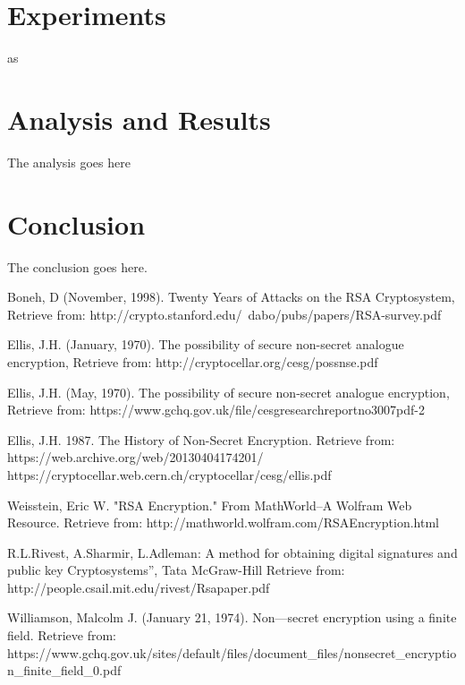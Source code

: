 \documentclass[conference,compsoc, 10pt]{IEEEtran}
\begin{document}
\section{Experiments}
as

\section{Analysis and Results}
The analysis goes here

\section{Conclusion}
The conclusion goes here.

\large
\begin{thebibliography}{1}
Boneh, D (November, 1998). Twenty Years of Attacks on the RSA Cryptosystem, Retrieve from: http://crypto.stanford.edu/~dabo/pubs/papers/RSA-survey.pdf

Ellis, J.H. (January, 1970). The possibility of secure non-secret analogue encryption, Retrieve from: http://cryptocellar.org/cesg/possnse.pdf

Ellis, J.H. (May, 1970). The possibility of secure non-secret analogue encryption, Retrieve from: https://www.gchq.gov.uk/file/cesgresearchreportno3007pdf-2

Ellis, J.H. 1987. The History of Non-Secret Encryption. Retrieve from: https://web.archive.org/web/20130404174201/\newline
https://cryptocellar.web.cern.ch/cryptocellar/cesg/ellis.pdf

Weisstein, Eric W. "RSA Encryption." From MathWorld--A Wolfram Web Resource. Retrieve from: http://mathworld.wolfram.com/RSAEncryption.html

R.L.Rivest, A.Sharmir, L.Adleman: A method for obtaining digital signatures and public key Cryptosystems”, Tata McGraw-Hill Retrieve from: http://people.csail.mit.edu/rivest/Rsapaper.pdf

Williamson, Malcolm J. (January 21, 1974). Non—secret encryption using a finite field. Retrieve from:
https://www.gchq.gov.uk/sites/default/files/document\_files/\newline nonsecret\_encryption\_finite\_field\_0.pdf

\end{thebibliography}
\end{document}
